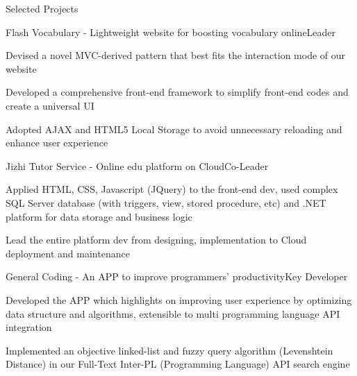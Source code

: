 \documentclass{resume} %
\begin{document}
\begin{rSection}{Selected Projects}

\begin{rSubsection}{Flash Vocabulary - Lightweight website for boosting vocabulary online}{Leader}{}{}
\item Devised a novel MVC-derived pattern that best fits the interaction mode of our website
\item Developed a comprehensive front-end framework to simplify front-end codes and create a universal UI
\item Adopted AJAX and HTML5 Local Storage to avoid unnecessary reloading and enhance user experience
\end{rSubsection}


\begin{rSubsection}{Jizhi Tutor Service - Online edu platform on Cloud}{Co-Leader}{}{}
\item Applied HTML, CSS, Javascript (JQuery) to the front-end dev, used complex SQL Server database (with triggers, view, stored procedure, etc) and .NET platform for data storage and business logic
\item Lead the entire platform dev from designing, implementation to Cloud deployment and maintenance
\end{rSubsection}


\begin{rSubsection}{General Coding - An APP to improve programmers' productivity}{Key Developer}{}{}
\item Developed the APP which highlights on improving user experience by optimizing data structure and algorithms, extensible to multi programming language API integration
\item Implemented an objective linked-list and fuzzy query algorithm (Levenshtein Distance) in our Full-Text
Inter-PL (Programming Language) API search engine
\end{rSubsection}


\end{rSection}

\end{document}

